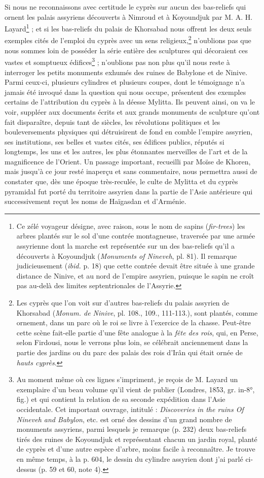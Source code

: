 \documentclass{article}
\begin{document}
Si nous ne reconnaissons avec certitude le cyprès sur aucun des bas-reliefs qui ornent les palais assyriens découverts à Nimroud et à Koyoundjuk par M. A. H. Layard\footnote{Ce zélé voyageur désigne, avec raison, sous le nom de sapins (\emph{fir-trees}) les arbres plantés sur le sol d'une contrée montagneuse, traversée par une armée assyrienne dont la marche est représentée sur un des bas-reliefs qu'il a découverts à Koyoundjuk (\emph{Monuments of Nineveh}, pl. 81). Il remarque judicieusement (\emph{ibid.} p. 18) que cette contrée devait être située à une grande distance de Ninive, et au nord de l'empire assyrien, puisque le sapin ne croît pas au-delà des limites septentrionales de l'Assyrie.} ; et si les bas-reliefs du palais de Khorsabad nous offrent les deux seuls exemples cités de l'emploi du cyprès avec un sens religieux,\footnote{Les cyprès que l'on voit sur d'autres bas-reliefs du palais assyrien de Khorsabad (\emph{Monum. de Ninive}, pl. 108., 109., 111-113.), sont plantés, comme ornement, dans un parc où le roi se livre à l'exercice de la chasse. Peut-être cette scène fait-elle partie d'une fête analogue à la \emph{fête des rois}, qui, en Perse, selon Firdousi, nous le verrons plus loin, se célébrait anciennement dans la partie des jardins ou du parc des palais des rois d'Irân qui était ornée de \emph{hauts cyprès}.} n'oublions pas que nous sommes loin de posséder la série entière des sculptures qui décoraient ces vastes et somptueux édifices\footnote{Au moment même où ces lignes s'impriment, je reçois de M. Layard un exemplaire d'un beau volume qu'il vient de publier (Londres, 1853, gr. in-8°, fig.) et qui contient la relation de sa seconde expédition dans l'Asie occidentale. Cet important ouvrage, intitulé : \emph{Discoveries in the ruins Of Nineveh and Babylon}, etc. est orné des dessins d'un grand nombre de monuments assyriens, parmi lesquels je remarque (p. 232) deux bas-reliefs tirés des ruines de Koyoundjuk et représentant chacun un jardin royal, planté de cyprès et d'une autre espèce d'arbre, moins facile à reconnaître. Je trouve en même temps, à la p. 604, le dessin du cylindre assyrien dont j'ai parlé ci-dessus (p. 59 et 60, note 4).} ; n'oublions pas non plus qu'il nous reste à interroger les petits monuments exhumés des ruines de Babylone et de Ninive. Parmi ceux-ci, plusieurs cylindres et plusieurs coupes, dont le témoignage n'a jamais été invoqué dans la question qui nous occupe, présentent des exemples certains de l'attribution du cyprès à la déesse Mylitta. Ils peuvent ainsi, on va le voir, suppléer aux documents écrits et aux grands monuments de sculpture qu'ont fait disparaître, depuis tant de siècles, les révolutions politiques et les bouleversements physiques qui détruisirent de fond en comble l'empire assyrien, ses institutions, ses belles et vastes cités, ses édifices publics, réputés si longtemps, les uns et les autres, les plus étonnantes merveilles de l'art et de la magnificence de l'Orient. Un passage important, recueilli par Moïse de Khoren, mais jusqu'à ce jour resté inaperçu et sans commentaire, nous permettra aussi de constater que, dès une époque très-reculée, le culte de Mylitta et du cyprès pyramidal fut porté du territoire assyrien dans la partie de l'Asie antérieure qui successivement reçut les noms de Haïgasdan et d'Arménie.
\end{document}

